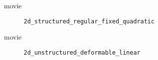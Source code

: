 

%
\begin{frame}{movie}
  \begin{figure}[h!]
    \caption{\lstinline{2d_structured_regular_fixed_quadratic}}
  \end{figure} 
\end{frame}



%
\begin{frame}{movie}
  \begin{figure}[h!]
    \caption{\lstinline{2d_unstructured_deformable_linear}}
  \end{figure} 
\end{frame}



%
%
%
